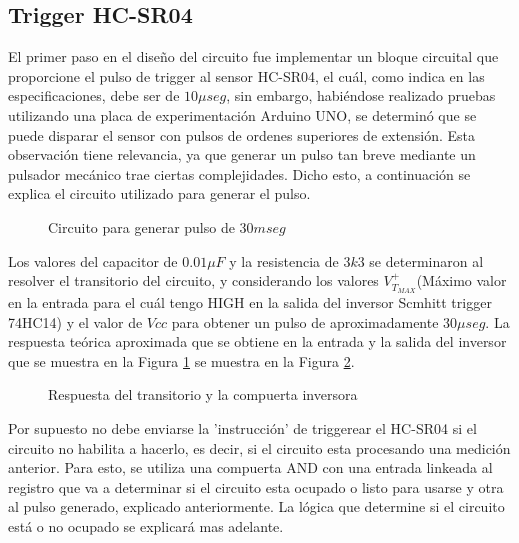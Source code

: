 

\subsection*{Trigger HC-SR04}

El primer paso en el diseño del circuito fue implementar un bloque circuital que proporcione el pulso de trigger al sensor HC-SR04, el cuál, como indica en las especificaciones, debe ser de $10 \mu seg$, sin embargo, habiéndose realizado pruebas utilizando una placa de experimentación Arduino UNO, se determinó que se puede disparar el sensor con pulsos de ordenes superiores de extensión. Esta observación tiene relevancia, ya que generar un pulso tan breve mediante un pulsador mecánico trae ciertas complejidades. Dicho esto, a continuación se explica el circuito utilizado para generar el pulso.
\bigskip

\begin{figure}[H]
\begin{center}

\end{center}
\caption{Circuito para generar pulso de $30 mseg$} \label{8_fig1}
\end{figure}

Los valores del capacitor de $0.01\mu F$ y la resistencia de $3k3$ se determinaron al resolver el transitorio del circuito, y considerando los valores $V_{T_{MAX}}^+$(Máximo valor en la entrada para el cuál tengo HIGH en la salida del inversor Scmhitt trigger 74HC14) y el valor de $Vcc$ para obtener un pulso de aproximadamente $30 \mu seg$. La respuesta teórica aproximada que se obtiene en la entrada y la salida del inversor que se muestra en la Figura \ref{8_fig1} se muestra en la Figura \ref{8_fig2}.

\begin{figure}[H]
\centering

\caption{Respuesta del transitorio y la compuerta inversora} 
\label{8_fig2}
\end{figure}

Por supuesto no debe enviarse la 'instrucción' de triggerear el HC-SR04 si el circuito no habilita a hacerlo, es decir, si el circuito esta procesando una medición anterior. Para esto, se utiliza una compuerta AND con una entrada linkeada al registro que va a determinar si el circuito esta ocupado o listo para usarse y otra al pulso generado, explicado anteriormente. La lógica que determine si el circuito está o no ocupado se explicará mas adelante.


